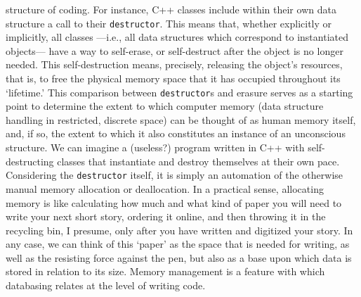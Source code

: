 structure of coding. For instance, C++ classes include within their own data structure a call to their \texttt{destructor}. This means that, whether explicitly or implicitly, all classes ---i.e., all data structures which correspond to instantiated objects--- have a way to self-erase, or self-destruct after the object is no longer needed. This self-destruction means, precisely, releasing the object's resources, that is, to free the physical memory space that it has occupied throughout its `lifetime.' This comparison between \texttt{destructor}s and erasure serves as a starting point to determine the extent to which computer memory (data structure handling in restricted, discrete space) can be thought of as human memory itself, and, if so, the extent to which it also constitutes an instance of an unconscious structure. We can imagine a (useless?) program written in C++ with self-destructing classes that instantiate and destroy themselves at their own pace. Considering the \texttt{destructor} itself, it is simply an automation of the otherwise manual memory allocation or deallocation. In a practical sense, allocating memory is like calculating how much and what kind of paper you will need to write your next short story, ordering it online, and then throwing it in the recycling bin, I presume, only after you have written and digitized your story. In any case, we can think of this `paper' as the space that is needed for writing, as well as the resisting force against the pen, but also as a base upon which data is stored in relation to its size. Memory management is a feature with which databasing relates at the level of writing code.



